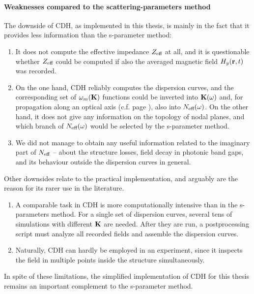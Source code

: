 \paragraph{Weaknesses compared to the scattering-parameters method}%
The downside of CDH, as implemented in this thesis, is mainly in the fact that it provides less information than the s-parameter method: 
\begin{enumerate}
\item{It does not compute the effective impedance $Z_{\text{eff} }$ at all, and it is questionable whether $Z_{\text{eff} }$ could be computed if also the averaged magnetic field $H_y({\mathbf{r}}, t)$ was recorded. } 
\item{On the one hand, CDH reliably computes the dispersion curves, and the corresponding set of $\omega_m({\mathbf{K}})$ functions could be inverted into ${\mathbf{K}}(\omega)$ and, for propagation along an optical axis (c.f. page \pageref{indexofrefraction}), also into $N_{\text{eff} }(\omega)$. On the other hand, it does not give any information on the topology of nodal planes, and which branch of $N_{\text{eff} }(\omega)$ would be selected by the s-parameter method. } 
\item{We did not manage to obtain any useful information related to the imaginary part of $N_{\text{eff} }$ -- about the structure losses, field decay in photonic band gaps, and its behaviour outside the dispersion curves in general.}
\end{enumerate}
Other downsides relate to the practical implementation, and arguably are the reason for its rarer use in the literature.
\begin{enumerate}
\item{A comparable task in CDH is more computationally intensive than in the s-parameters method. For a single set of dispersion curves, several tens of simulations with different ${\mathbf{K}}$ are needed. After they are run, a postprocessing script must analyze all recorded fields and assemble the dispersion curves. }
\item{Naturally, CDH can hardly be employed in an experiment, since it inspects the field in multiple points inside the structure simultaneously. }
\end{enumerate}
In spite of these limitations, the simplified implementation of CDH for this thesis remains an important complement to the s-parameter method. 


